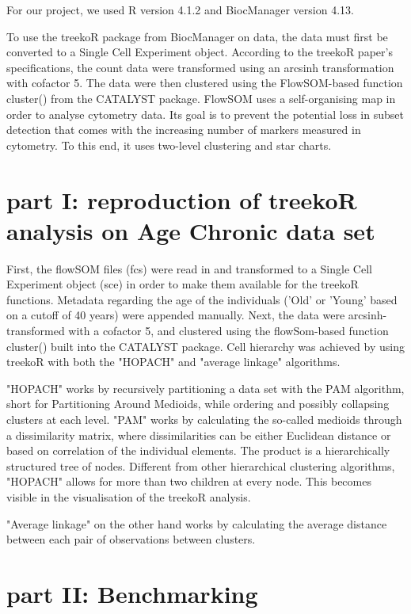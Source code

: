 \documentclass[11pt,a4paper,twoside]{report}\usepackage[]{graphicx}\usepackage[]{color}
\begin{document}
For our project, we used R version 4.1.2 and BiocManager version 4.13. 

To use the treekoR package from BiocManager on data, the data must first be converted to a Single Cell Experiment object. According to the treekoR paper's specifications, the count data were transformed using an arcsinh transformation with cofactor 5. The data were then clustered using the FlowSOM-based function cluster() from the CATALYST package. 
FlowSOM uses a self-organising map in order to analyse cytometry data. Its goal is to prevent the potential loss in subset detection that comes with the increasing number of markers measured in cytometry. To this end, it uses two-level clustering and star charts. %


\section{part I: reproduction of treekoR analysis on Age Chronic data set}

First, the flowSOM files (fcs) were read in and transformed to a Single Cell Experiment object (sce) in order to make them available for the treekoR functions. Metadata regarding the age of the individuals ('Old' or 'Young' based on a cutoff of 40 years) were appended manually. Next, the data were arcsinh-transformed with a cofactor 5, and clustered using the flowSom-based function cluster() built into the CATALYST package. %
Cell hierarchy was achieved by using treekoR with both the "HOPACH" and "average linkage" algorithms.

"HOPACH" works by recursively partitioning a data set with the PAM algorithm, short for Partitioning Around Medioids, while ordering and possibly collapsing clusters at each level. "PAM" works by calculating the so-called medioids through a dissimilarity matrix, where dissimilarities can be either Euclidean distance or based on correlation of the individual elements. The product is a hierarchically structured tree of nodes. Different from other hierarchical clustering algorithms, "HOPACH" allows for more than two children at every node. This becomes visible in the visualisation of the treekoR analysis. %

"Average linkage" on the other hand works by calculating the average distance between each pair of observations between clusters. %


\section{part II: Benchmarking}
\end{document}
